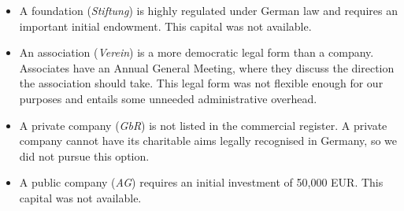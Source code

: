 \documentclass[nonflat,smallfont
]{langsci/langscibook}
\newcommand{\othersolutions}[1]{
  \renewcommand{\tblslinecolour}{lsDarkGreenOne}
  \tblssy{more}{Other solutions}{\vspace*{-5mm}#1}
}
\renewcommand{\tblssy}[4][black!12]{%
  \renewcommand{\langscisymbol}{#2}\renewcommand{\tblsboxcolor}{#1}
  \begin{mdframed}[style=yellowexercise,frametitle={#3}]
    #4
  \end{mdframed}
}
\begin{document}
\othersolutions{
\begin{itemize}
 \item A foundation (\textit{Stiftung}) is highly regulated under German law and requires an important initial endowment. This capital was not available. 
 \item An association (\textit{Verein}) is a more democratic legal form than a company. Associates have an Annual General Meeting, where they discuss the direction the association should take. This legal form was not flexible enough for our purposes and entails some unneeded administrative overhead. 
 \item A private company (\textit{GbR}) is not listed in the commercial register. A private company cannot have its charitable aims legally recognised in Germany, so we did not pursue this option.  
 \item A public company (\textit{AG}) requires an initial investment of 50,000 EUR. This capital was not available.  
\end{itemize} 
} 
\end{document}
